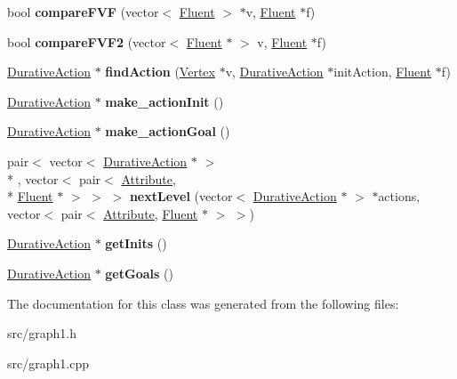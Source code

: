 \begin{DoxyCompactItemize}
\item 
\hypertarget{classGraph1_a837205a6dcaded757431f05c423d655d}{bool {\bfseries compare\+F\+V\+F} (vector$<$ \hyperlink{classFluent}{Fluent} $>$ $\ast$v, \hyperlink{classFluent}{Fluent} $\ast$f)}\label{classGraph1_a837205a6dcaded757431f05c423d655d}

\item 
\hypertarget{classGraph1_a6761cc71fb792b357066a6c98ddf73b5}{bool {\bfseries compare\+F\+V\+F2} (vector$<$ \hyperlink{classFluent}{Fluent} $\ast$ $>$ v, \hyperlink{classFluent}{Fluent} $\ast$f)}\label{classGraph1_a6761cc71fb792b357066a6c98ddf73b5}

\item 
\hypertarget{classGraph1_a02fd165b27835ed38ebdb35b2b3c67af}{\hyperlink{classDurativeAction}{Durative\+Action} $\ast$ {\bfseries find\+Action} (\hyperlink{classVertex}{Vertex} $\ast$v, \hyperlink{classDurativeAction}{Durative\+Action} $\ast$init\+Action, \hyperlink{classFluent}{Fluent} $\ast$f)}\label{classGraph1_a02fd165b27835ed38ebdb35b2b3c67af}

\item 
\hypertarget{classGraph1_a4380d76bf8a13a76096f18eba1b6441a}{\hyperlink{classDurativeAction}{Durative\+Action} $\ast$ {\bfseries make\+\_\+action\+Init} ()}\label{classGraph1_a4380d76bf8a13a76096f18eba1b6441a}

\item 
\hypertarget{classGraph1_a8d4dbc60613b105f8f08e8997003cf75}{\hyperlink{classDurativeAction}{Durative\+Action} $\ast$ {\bfseries make\+\_\+action\+Goal} ()}\label{classGraph1_a8d4dbc60613b105f8f08e8997003cf75}

\item 
\hypertarget{classGraph1_ac80ac63c83401b759cce0a98ba0f399e}{pair$<$ vector$<$ \hyperlink{classDurativeAction}{Durative\+Action} $\ast$ $>$\\*
, vector$<$ pair$<$ \hyperlink{classAttribute}{Attribute}, \\*
\hyperlink{classFluent}{Fluent} $\ast$ $>$ $>$ $>$ {\bfseries next\+Level} (vector$<$ \hyperlink{classDurativeAction}{Durative\+Action} $\ast$ $>$ $\ast$actions, vector$<$ pair$<$ \hyperlink{classAttribute}{Attribute}, \hyperlink{classFluent}{Fluent} $\ast$ $>$ $>$)}\label{classGraph1_ac80ac63c83401b759cce0a98ba0f399e}

\item 
\hypertarget{classGraph1_a64337170c4b7830e27d5684884b45507}{\hyperlink{classDurativeAction}{Durative\+Action} $\ast$ {\bfseries get\+Inits} ()}\label{classGraph1_a64337170c4b7830e27d5684884b45507}

\item 
\hypertarget{classGraph1_af0511f80664ad14483a21a47e9d5417a}{\hyperlink{classDurativeAction}{Durative\+Action} $\ast$ {\bfseries get\+Goals} ()}\label{classGraph1_af0511f80664ad14483a21a47e9d5417a}

\end{DoxyCompactItemize}


The documentation for this class was generated from the following files\+:\begin{DoxyCompactItemize}
\item 
src/graph1.\+h\item 
src/graph1.\+cpp\end{DoxyCompactItemize}
